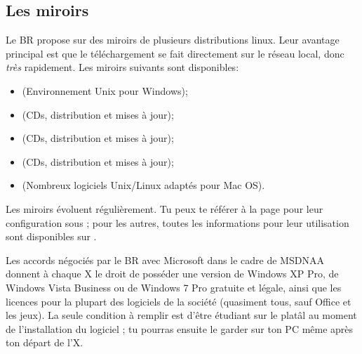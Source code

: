 \subsection{Les miroirs}
Le BR propose sur  des miroirs de plusieurs distributions linux. Leur avantage principal est que le téléchargement se fait directement sur le réseau local, donc \emph{très} rapidement.
Les miroirs suivants sont disponibles:

\begin{itemize}
\item {} (Environnement Unix pour Windows);
\item {} (CDs, distribution et mises à jour);
\item {} (CDs, distribution et mises à jour);
\item {} (CDs, distribution et mises à jour);
\item {} (Nombreux logiciels Unix/Linux adaptés pour Mac OS).
\end{itemize}

Les miroirs évoluent régulièrement. Tu peux te référer \`a la page \pageref{ubuntu_mirror} pour leur configuration sous  ; pour les autres, toutes les informations pour leur utilisation sont disponibles sur .

\label{msdnaa} Les accords n\'egoci\'es par le BR avec Microsoft dans le cadre de MSDNAA donnent \`a  chaque X le droit de poss\'eder une version de Windows
XP Pro, de Windows Vista Business ou de Windows 7 Pro gratuite et l\'egale, ainsi que les licences pour la plupart des logiciels de la soci\'et\'e (quasiment tous, sauf
Office et les jeux). La seule condition \`a  remplir est d'\^etre \'etudiant sur le plat\^al au moment de l'installation du logiciel ; tu pourras ensuite le
garder sur ton PC m\^eme apr\`es ton d\'epart de l'X.

